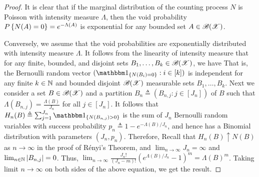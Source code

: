 \documentclass[letterpaper,10pt,english]{article}
\begin{document}
\begin{proof}
It is clear that if the marginal distribution of the counting process $N$ is Poisson with intensity measure $\Lambda$, then the void probability $P\left\{N(A) = 0\right\} = e^{-\Lambda(A)}$ is exponential for any bounded set $A \in \mathscr{B}(\mathscr{X})$. 

Conversely, we assume that the void probabilities are exponentially distributed with intensity measure $\Lambda$. 
It follows from the linearity of intensity measure that for any finite, bounded, and disjoint sets $B_1, \dots, B_k \in \mathscr{B}(\mathscr{X})$, we have 
That is, the Bernoulli random vector $(\SetIn{N(B_i) = 0}: i \in [k])$ is independent for any finite $k \in \mathbb{N}$ and bounded disjoint $\mathscr{B}(\mathscr{X})$ measurable sets $B_1, \dots, B_k$. 
Next we consider a set $B \in \mathscr{B}(\mathscr{X})$ and a partition $B_n \triangleq (B_{n,j}: j \in [J_n])$ of $B$ such that $\Lambda(B_{n,j}) = \frac{\Lambda(B)}{J_n}$ for all $j \in [J_n]$. 
It follows that $H_n(B) \triangleq \sum_{j=1}^{J_n}\SetIn{N(B_{n,j})> 0}$ is the sum of $J_n$ \iid Bernoulli random variables with success probability $p_n \triangleq 1-e^{-\Lambda(B)/J_n}$, 
and hence has a Binomial distribution with parameters $(J_n, p_n)$.   
Therefore, 
Recall that $H_n(B) \uparrow N(B)$ as $n\to\infty$ in the proof of R\'{e}nyi's Theorem, 
and $\lim_{n\to\infty}J_n = \infty$ and $\lim_{n\in\mathbb{N}}\left\lvert B_{n,j}\right\rvert= 0$. 
Thus, $\lim_{n\to\infty}\frac{J_n!}{(J_n-m)!}(e^{\Lambda(B)/J_n}-1)^m = \Lambda(B)^m$.
Taking limit $n\to\infty$ on both sides of the above equation, we get the result. 

\end{proof}
\end{document}
